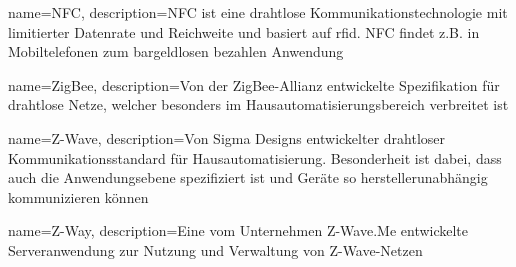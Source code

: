 
{
	name={NFC},
	description={NFC ist eine drahtlose Kommunikationstechnologie mit limitierter Datenrate und Reichweite und basiert auf \gls{rfid}. NFC findet z.B. in Mobiltelefonen zum bargeldlosen bezahlen Anwendung}
}




{
	name={ZigBee},
	description={Von der ZigBee-Allianz entwickelte Spezifikation für drahtlose Netze, welcher besonders im Hausautomatisierungsbereich verbreitet ist}
}

{
	name={Z-Wave},
	description={Von Sigma Designs entwickelter drahtloser Kommunikationsstandard für Hausautomatisierung. Besonderheit ist dabei, dass auch die Anwendungsebene spezifiziert ist und Geräte so herstellerunabhängig kommunizieren können}
}

{
	name={Z-Way},
	description={Eine vom Unternehmen Z-Wave.Me entwickelte Serveranwendung zur Nutzung und Verwaltung von Z-Wave-Netzen}
}